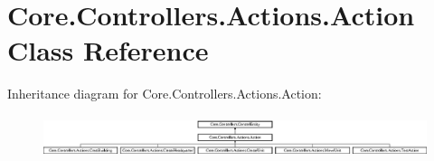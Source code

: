 \hypertarget{classCore_1_1Controllers_1_1Actions_1_1Action}{\section{Core.\-Controllers.\-Actions.\-Action Class Reference}
\label{classCore_1_1Controllers_1_1Actions_1_1Action}
}
Inheritance diagram for Core.\-Controllers.\-Actions.\-Action\-:\begin{figure}[H]
\begin{center}
\leavevmode
\includegraphics[height=1.235294cm]{classCore_1_1Controllers_1_1Actions_1_1Action}
\end{center}
\end{figure}
